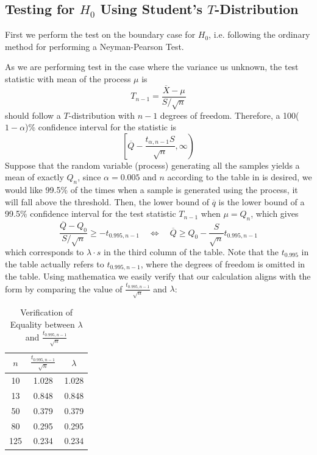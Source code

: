 \documentclass[12pt]{article}
\begin{document}
\subsection{Testing for $H_0$ Using Student's $T$-Distribution}

First we perform the test on the boundary case for $H_0$, i.e. following the ordinary method for performing a Neyman-Pearson Test. 

As we are performing test in the case where the variance us unknown, the test statistic with mean of the process $\mu$ is 
$$
T_{n-1} = \dfrac{\overline{X} - \mu}{S/\sqrt{n}}
$$
should follow a $T$-distribution with $n-1$ degrees of freedom. Therefore, a 100($1-\alpha$)\% confidence interval for the statistic is
$$
\left[\overline{Q}-\dfrac{t_{\alpha,n-1}S}{\sqrt{n}},\infty\right)
$$
Suppose that the random variable (process) generating all the samples yields a mean of exactly $Q_n$, since $\alpha = 0.005$ and $n$ according to the table in \cite{JJF2005} is desired, we would like 99.5\% of the times when a sample is generated using the process, it will fall above the threshold. Then, the lower bound of $\overline{q}$ is the lower bound of a 99.5\% confidence interval for the test statistic $T_{n-1}$ when $\mu = Q_n$, which gives
$$
\dfrac{\overline{Q} - Q_0}{S/\sqrt{n}} \geq -t_{0.995, n-1} \quad\Leftrightarrow\quad \overline{Q}\geq Q_0-\dfrac{S}{\sqrt{n}}t_{0.995, n-1}
$$ 
which corresponds to $\lambda\cdot s$ in the third column of the table. Note that the $t_{0.995}$ in the table actually refers to $t_{0.995, n-1}$, where the degrees of freedom is omitted in the table. Using mathematica we easily verify that our calculation aligns with the form by comparing the value of $\frac{t_{0.995, n-1}}{\sqrt{n}}$ and $\lambda$:

\begin{table}[htbp]
    \centering
    \begin{tabular}{ccc}
        \toprule
        $n$ & $\frac{t_{0.995, n-1}}{\sqrt{n}}$ & $\lambda$ \\
        \midrule
        10 & 1.028 & 1.028 \\
        13 & 0.848 & 0.848 \\
        50 & 0.379 & 0.379 \\
        80 & 0.295 & 0.295 \\
        125 & 0.234 & 0.234 \\
        \bottomrule
    \end{tabular}
    \caption{Verification of Equality between $\lambda$ and $\frac{t_{0.995, n-1}}{\sqrt{n}}$}
\end{table}
\end{document}
